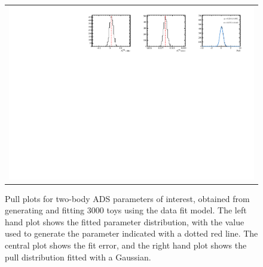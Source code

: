 \begin{figure}
\begin{tabular}{c}
\includegraphics[width=\textwidth]{ANA_resources/Plots/Data_fit/FitterBias//A_Bs_piK.pdf} \\
  \end{tabular}
  \caption{Pull plots for two-body ADS parameters of interest, obtained from generating and fitting 3000 toys using the data fit model. The left hand plot shows the fitted parameter distribution, with the value used to generate the parameter indicated with a dotted red line. The central plot shows the fit error, and the right hand plot shows the pull distribution fitted with a Gaussian.}
\label{fig:twoBody_ADS_pulls}
\end{figure}
